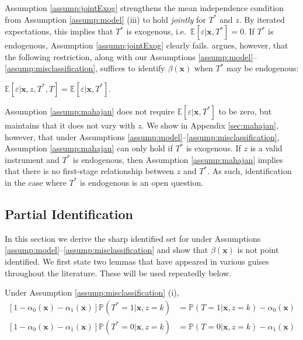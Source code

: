 Assumption \ref{assump:jointExog} strengthens the mean independence condition from Assumption \ref{assump:model} (iii) to hold \emph{jointly} for $T^*$ and $z$.
By iterated expectations, this implies that $T^*$ is exogenous, i.e.\ $\mathbb{E}[\varepsilon|\mathbf{x},T^*] = 0$.
If $T^*$ is endogenous, Assumption \ref{assump:jointExog} clearly fails.
\cite{Mahajan} argues, however, that the following restriction, along with our Assumptions \ref{assump:model}--\ref{assump:misclassification}, suffices to identify $\beta(\mathbf{x})$ when $T^*$ may be endogenous:
\begin{assump} \mbox{}
  \label{assump:mahajan}
  $\mathbb{E}[\varepsilon|\mathbf{x}, z, T^*, T] = \mathbb{E}[\varepsilon|\mathbf{x},T^*]$.
\end{assump}
Assumption \ref{assump:mahajan} does not require $\mathbb{E}[\varepsilon|\mathbf{x},T^*]$ to be zero, but maintains that it does not vary with $z$.
We show in Appendix \ref{sec:mahajan}, however, that under 
Assumptions \ref{assump:model}--\ref{assump:misclassification}, Assumption \ref{assump:mahajan} can only hold if $T^*$ is exogenous.
If $z$ is a valid instrument and $T^*$ is endogenous, then Assumption \ref{assump:mahajan} implies that there is no first-stage relationship between $z$ and $T^*$.
As such, identification in the case where $T^*$ is endogenous is an open question. 




\subsection{Partial Identification}

In this section we derive the sharp identified set for under Assumptions \ref{assump:model}--\ref{assump:misclassification} and show that  $\beta(\mathbf{x})$ is not point identified.
We first state two lemmas that have appeared in various guises throughout the literature. 
These will be used repeatedly below.
\begin{lem}
\label{lem:p_pstar}
  Under Assumption \ref{assump:misclassification} (i),
\begin{align*}
  \left[ 1 - \alpha_0(\mathbf{x}) - \alpha_1(\mathbf{x}) \right]\mathbb{P}(T^*=1|\mathbf{x}, z=k) &= \mathbb{P}(T=1|\mathbf{x},z=k) - \alpha_0(\mathbf{x})\\
  \left[ 1 - \alpha_0(\mathbf{x}) - \alpha_1(\mathbf{x}) \right]\mathbb{P}(T^*=0|\mathbf{x}, z=k) &= \mathbb{P}(T=0|\mathbf{x},z=k) - \alpha_1(\mathbf{x})
\end{align*}
\end{lem} 

